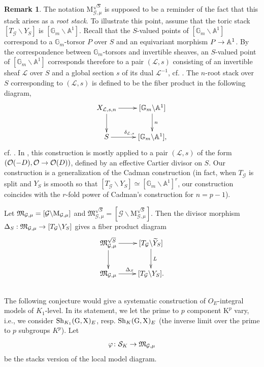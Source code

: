 \documentclass[reqno, 10pt]{amsart}
\makeatletter
\newcommand{\tysup}[1]{^{\scriptscriptstyle #1}}
\newcommand{\fkM}{\ensuremath{\mathfrak{M}}\xspace}
\newcommand{\BA}{\ensuremath{\mathbb {A}}\xspace}
\newcommand{\BG}{\ensuremath{\mathbb {G}}\xspace}
\newcommand{\CG}{\ensuremath{\mathcal {G}}\xspace}
\newcommand{\CL}{\ensuremath{\mathcal {L}}\xspace}
\newcommand{\CO}{\ensuremath{\mathcal {O}}\xspace}
\newcommand{\CS}{\ensuremath{\mathcal {S}}\xspace}
\newcommand{\RG}{\ensuremath{\mathrm {G}}\xspace}
\newcommand{\RK}{\ensuremath{\mathrm {K}}\xspace}
\newcommand{\RX}{\ensuremath{\mathrm {X}}\xspace}
\newcommand{\wt}{\widetilde}
\newcommand{\bs}{\backslash}
\theoremstyle{definition}
\newtheorem{remark}[subsubsection]{Remark}
\numberwithin{equation}{subsection}
\numberwithin{subsubsection}{subsection}
\renewcommand{\to}{%
   \ifbool{@display}{\longrightarrow}{\rightarrow}%
   }
\newcommand{\Mloc}{{\rm M}}
\newcommand{\Mlocroot}{{\mathrm M}^{\sqrt{S}}}
\makeatother
\begin{document}
 \begin{remark}\label{intro:rootstack}
The notation $\Mlocroot_{\CG,\mu}$ is supposed to be a reminder of the fact that this stack
 arises as a \emph{root stack}. To illustrate this point, assume that  the toric stack $[T_\CG \bs Y_S] $ is $[\BG_m\bs \BA^1]$. Recall that the $S$-valued points of $[\BG_m\bs \BA^1]$ correspond to a $\BG_m$-torsor $P$ over $S$ and an equivariant morphism  $P\to \BA^1$. By the  correspondence between $\BG_m$-torsors and invertible sheaves, an $S$-valued point of $[\BG_m\bs \BA^1]$ corresponds therefore to a pair $(\CL, s)$ consisting of an invertible sheaf $\CL$ over $S$ and  a global section $s$ of its dual $\CL^{-1}$, cf. \cite[Ex. 5.13]{Ol}. The $n$-root stack over $S$ corresponding to  $(\CL, s)$ is defined to be the fiber product in the following diagram,
\begin{equation*}\label{GMrootstack}
\begin{aligned}
 \xymatrix{
      X_{\CL, s, n} \ar[r] \ar[d]  &   [\BG_m \bs \BA^1 ] \ar[d]^{n} \\
       S\ar[r]^{\delta_{\CL, s}} &  [\BG_m \bs \BA^1 ]  ,
        }
        \end{aligned}
\end{equation*}
cf. \cite[Def. 2.2.1]{Cadman}. In \cite{Cadman}, this construction is mostly applied to a pair $(\CL, s)$ of the form $(\CO(-D), \CO\to\CO(D))$, defined by an effective Cartier divisor on $S$. Our construction is a generalization of the Cadman construction (in fact, when $T_\CG$ is split and $Y_S$ is smooth so that $[T_\CG \bs Y_S ]\simeq [\BG_m\bs \BA^1]^r$, our construction coincides with the $r$-fold power of Cadman's construction for $n=p-1$). 
\end{remark}
 

 
Let $\fkM_{\CG,\mu}=[\CG\bs  \Mloc_{\CG,\mu}]$ and $\fkM\tysup{\sqrt{S}}_{\CG,\mu}=[\CG\bs  \Mlocroot_{\CG,\mu}]$. Then the divisor morphism  $\Delta_S: \fkM_{\CG,\mu}\to [T_\CG\bs Y_S]$ gives  a fiber product
 diagram
 \begin{equation}\label{CDrootstackIntr}
\begin{aligned}
 \xymatrix{
      \fkM^{\sqrt{S}}_{\CG,\mu} \ar[r] \ar[d]  &   [T_\CG \bs \wt Y_S ] \ar[d]^L \\
       \fkM_{\CG,\mu}\ar[r]^{\Delta_S} &  [T_\CG \bs Y_S ]  .
        }
        \end{aligned}
\end{equation}
  
 \subsection{}  The following conjecture would give a systematic construction of $O_E$-integral models of $K_1$-level. In its statement, we let the prime to $p$ component $\RK^p$ vary, i.e., we consider  ${\rm Sh}_{K_1}(\RG, \RX)_E$, resp. ${\rm Sh}_{K}(\RG, \RX)_E$ (the inverse limit  over the prime to $p$ subgroups $K^p$). Let 
  \[
  \varphi\colon \CS_{K}\to  \fkM_{\CG,\mu}
  \]
 be the stacks version of the local model diagram. 
 
\end{document}
